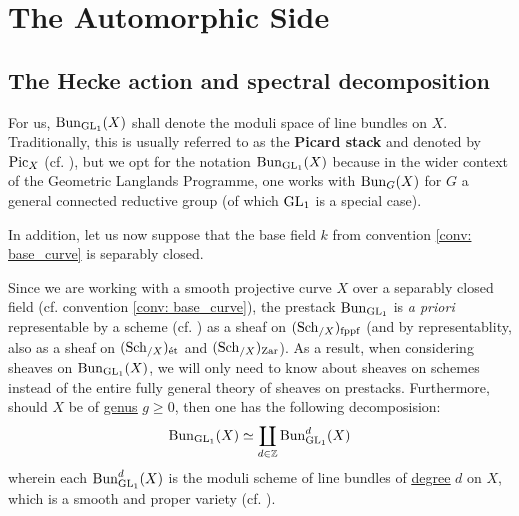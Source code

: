 \section{The Automorphic Side}
    \subsection{The Hecke action and spectral decomposition}
        \begin{convention}
            For us, $\mathrm{Bun}_{\operatorname{GL}_1}(X)$ shall denote the moduli space of line bundles on $X$. Traditionally, this is usually referred to as the \textbf{Picard stack} and denoted by $\mathrm{Pic}_X$ (cf. \cite[\href{https://stacks.math.columbia.edu/tag/0372}{Tag 0372}]{stacks}), but we opt for the notation $\mathrm{Bun}_{\operatorname{GL}_1}(X)$ because in the wider context of the Geometric Langlands Programme, one works with $\mathrm{Bun}_G(X)$ for $G$ a general connected reductive group (of which $\operatorname{GL}_1$ is a special case). 
            
            In addition, let us now suppose that the base field $k$ from convention \ref{conv: base_curve} is separably closed.
        \end{convention}
        \begin{remark} \label{remark: geometry_of_the_picard_stack}
            Since we are working with a smooth projective curve $X$ over a separably closed field (cf. convention \ref{conv: base_curve}), the prestack $\mathrm{Bun}_{\operatorname{GL}_1}$ is \textit{a priori} representable by a scheme (cf. \cite[\href{https://stacks.math.columbia.edu/tag/0B9Z}{Tag 0B9Z}]{stacks}) as a sheaf on $(\mathrm{Sch}_{/X})_{\mathrm{fppf}}$ (and by representablity, also as a sheaf on $(\mathrm{Sch}_{/X})_{\mathrm{\acute{e}t}}$ and $(\mathrm{Sch}_{/X})_{\mathrm{Zar}}$). As a result, when considering sheaves on $\mathrm{Bun}_{\operatorname{GL}_1}(X)$, we will only need to know about sheaves on schemes instead of the entire fully general theory of sheaves on prestacks. Furthermore, should $X$ be of \href{https://stacks.math.columbia.edu/tag/0BY6}{\underline{genus}} $g \geq 0$, then one has the following decomposision:
                $$\mathrm{Bun}_{\operatorname{GL}_1}(X) \simeq \coprod_{d \in \mathbb{Z}} \mathrm{Bun}_{\operatorname{GL}_1}^d(X)$$
            wherein each $\mathrm{Bun}_{\operatorname{GL}_1}^d(X)$ is the moduli scheme of line bundles of \href{https://stacks.math.columbia.edu/tag/0AYQ}{\underline{degree}} $d$ on $X$, which is a smooth and proper variety (cf. \cite[\href{https://stacks.math.columbia.edu/tag/0BA0}{Tag 0BA0}]{stacks}).
        \end{remark}
        

